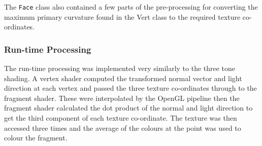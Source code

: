      The \texttt{Face} class also contained a few parts of the pre-processing
      for converting the maximum primary curvature found in the Vert class to
      the required texture co-ordinates.


    \subsubsection{Run-time Processing}

      The run-time processing was implemented very similarly to the three tone
      shading.  A vertex shader computed the transformed normal vector and light
      direction at each vertex and passed the three texture co-ordinates through
      to the fragment shader.  These were interpolated by the OpenGL pipeline
      then the fragment shader calculated the dot product of the normal and
      light direction to get the third component of each texture co-ordinate.
      The texture was then accessed three times and the average of the colours
      at the point was used to colour the fragment.
